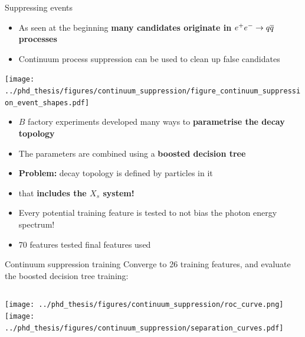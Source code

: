 \documentclass[xcolor=dvipsnames]{beamer}
\begin{document}
\begin{frame}{Suppressing \qqbar events}
   \centering\scriptsize
   \begin{itemize}
      \item As seen at the beginning \textbf{many candidates originate in} {\boldmath$e^+e^-\rightarrow q\overline q$} \textbf{processes}
      \item[\ra] Continuum process suppression can be used to clean up false \g candidates
   \end{itemize}

   \texttt{[image: ../phd\_thesis/figures/continuum\_suppression/figure\_continuum\_suppression\_event\_shapes.pdf]}

\begin{itemize}
\item $B$ factory experiments developed many ways to \textbf{parametrise the decay topology}
\item The parameters are combined using a \textbf{boosted decision tree}
\item \textbf{Problem:} decay topology is defined by particles in it 
\item[\ra] that \textbf{includes the $X_s$ system!}
\item Every potential training feature is tested to not bias the photon energy spectrum!
\item[\ra] 70 features tested  final features used
\end{itemize}

\end{frame}



\begin{frame}{Continuum suppression training}
   \scriptsize\centering
   Converge to 26 training features, and evaluate the boosted decision tree training:

   \begin{columns}
      \texttt{[image: ../phd\_thesis/figures/continuum\_suppression/roc\_curve.png]}
      \texttt{[image: ../phd\_thesis/figures/continuum\_suppression/separation\_curves.pdf]}



   \end{columns}
\end{frame}
\end{document}
